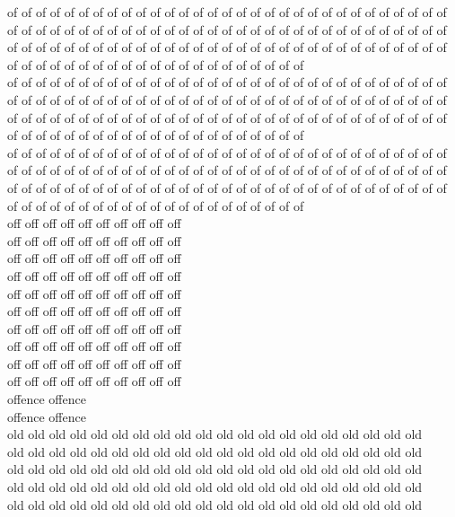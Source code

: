 of of of of of of of of of of of of of of of of of of of of of of of of of of of of of of of of of of of of of of of of of of of of of of of of of of of of of of of of of of of of of of of of of of of of of of of of of of of of of of of of of of of of of of of of of of of of of of of of of of of of of of of of of of of of of of of of of of\\
of of of of of of of of of of of of of of of of of of of of of of of of of of of of of of of of of of of of of of of of of of of of of of of of of of of of of of of of of of of of of of of of of of of of of of of of of of of of of of of of of of of of of of of of of of of of of of of of of of of of of of of of of of of of of of of of of of\\
of of of of of of of of of of of of of of of of of of of of of of of of of of of of of of of of of of of of of of of of of of of of of of of of of of of of of of of of of of of of of of of of of of of of of of of of of of of of of of of of of of of of of of of of of of of of of of of of of of of of of of of of of of of of of of of of of of\\
off off off off off off off off off off\\
off off off off off off off off off off\\
off off off off off off off off off off\\
off off off off off off off off off off\\
off off off off off off off off off off\\
off off off off off off off off off off\\
off off off off off off off off off off\\
off off off off off off off off off off\\
off off off off off off off off off off\\
off off off off off off off off off off\\
offence offence\\
offence offence\\
old old old old old old old old old old old old old old old old old old old old\\
old old old old old old old old old old old old old old old old old old old old\\
old old old old old old old old old old old old old old old old old old old old\\
old old old old old old old old old old old old old old old old old old old old\\
old old old old old old old old old old old old old old old old old old old old\\
